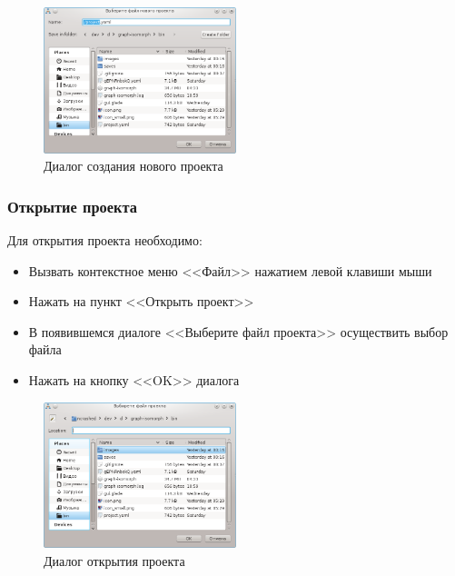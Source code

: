 \documentclass[russian,utf8,emptystyle]{eskdtext}
\begin{document}
\begin{figure}[h!]
\centering
\includegraphics[width=0.5\textwidth]{screen04}
\caption{Диалог создания нового проекта}
\end{figure}

\subsubsection{Открытие проекта}
Для открытия проекта необходимо:
\begin{itemize}
\item Вызвать контекстное меню <<Файл>> нажатием левой клавиши мыши
\item Нажать на пункт <<Открыть проект>>
\item В появившемся диалоге <<Выберите файл проекта>> осуществить выбор файла
\item Нажать на кнопку <<OK>> диалога
\end{itemize}

\begin{figure}[h!]
\centering
\includegraphics[width=0.5\textwidth]{screen05}
\caption{Диалог открытия проекта}
\end{figure}
\end{document}
